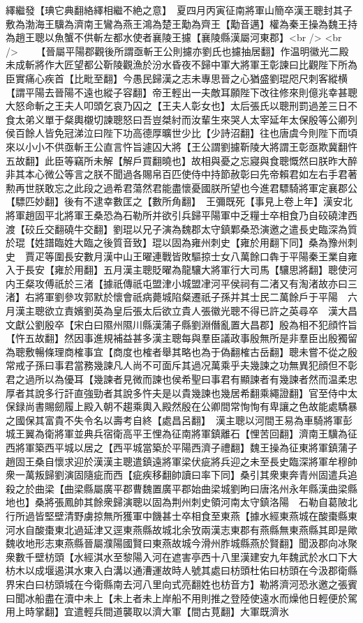 繹繼發【琠它典翻絡繹相繼不絶之意】　夏四月丙寅征南將軍山簡卒漢王聰封其子敷為渤海王驥為濟南王鸞為燕王鴻為楚王勱為齊王【勱音邁】權為秦王操為魏王持為趙王聰以魚蟹不供斬左都水使者襄陵王攄【襄陵縣漢屬河東郡】<br />
<br />
　　【晉屬平陽郡觀後所謂亟斬王公則攄亦劉氏也攄抽居翻】作温明徽光二殿未成斬將作大匠望都公靳陵觀漁於汾水昏夜不歸中軍大將軍王彰諫曰比觀陛下所為臣實痛心疾首【比毗至翻】今愚民歸漢之志未專思晉之心猶盛劉琨咫尺刺客縱横【謂平陽去晉陽不遠也縱子容翻】帝王輕出一夫敵耳願陛下改往修來則億兆幸甚聰大怒命斬之王夫人叩頭乞哀乃囚之【王夫人彰女也】太后張氏以聰刑罰過差三日不食太弟义單于粲輿櫬切諫聰怒曰吾豈桀紂而汝輩生來哭人太宰延年太保殷等公卿列侯百餘人皆免冠涕泣曰陛下功高德厚曠世少比【少詩沼翻】往也唐虞今則陛下而頃來以小小不供亟斬王公直言忤旨遽囚大將【王公謂劉攄靳陵大將謂王彰亟欺冀翻忤五故翻】此臣等竊所未解【解戶買翻曉也】故相與憂之忘寢與食聰慨然曰朕昨大醉非其本心微公等言之朕不聞過各賜帛百匹使侍中持節赦彰曰先帝賴君如左右手君著勲再世朕敢忘之此段之過希君蕩然君能盡懷憂國朕所望也今進君驃騎將軍定襄郡公【驃匹妙翻】後有不逮幸數匡之【數所角翻】　王彌既死【事見上卷上年】漢安北將軍趙固平北將軍王桑恐為石勒所并欲引兵歸平陽軍中乏糧士卒相食乃自䂭磽津西渡【䂭丘交翻磽牛交翻】劉琨以兄子演為魏郡太守鎮鄴桑恐演邀之遣長史臨深為質於琨【姓譜臨姓大臨之後質音致】琨以固為雍州刺史【雍於用翻下同】桑為豫州刺史　賈疋等圍長安數月漢中山王曜連戰皆敗驅掠士女八萬餘口犇于平陽秦王業自雍入于長安【雍於用翻】五月漢主聰貶曜為龍驤大將軍行大司馬【驤思將翻】聰使河内王粲攻傅祇於三渚【據祇傳祇屯盟津小城盟冿河平侯祠有二渚又有淘渚故亦曰三渚】右將軍劉參攻郭默於懷會祇病薨城陷粲遷祇子孫并其士民二萬餘戶于平陽　六月漢主聰欲立責嬪劉英為皇后張太后欲立貴人張徽光聰不得已許之英尋卒　漢大昌文獻公劉殷卒【宋白曰隰州隰川縣漢蒲子縣劉淵僭亂置大昌郡】殷為相不犯顔忤旨【忤五故翻】然因事進規補益甚多漢主聰每與羣臣議政事殷無所是非羣臣出殷獨留為聰敷暢條理商榷事宜【商度也榷者舉其略也為于偽翻榷古岳翻】聰未嘗不從之殷常戒子孫曰事君當務幾諫凡人尚不可面斥其過况萬乘乎夫幾諫之功無異犯顔但不彰君之過所以為優耳【幾諫者見微而諫也侯希聖曰事君有顯諫者有幾諫者然而温柔忠厚者其說多行訐直強勁者其說多忤夫是以貴幾諫也幾居希翻乘繩證翻】官至侍中太保録尚書賜劒履上殿入朝不趨乘輿入殿然殷在公卿間常恂恂有卑讓之色故能處驕暴之國保其富貴不失令名以壽考自終【處昌呂翻】　漢主聰以河間王易為車騎將軍彭城王翼為衛將軍並典兵宿衛高平王悝為征南將軍鎮離石【悝苦回翻】濟南王驥為征西將軍築西平城以居之【西平城當築於平陽西濟子禮翻】魏王操為征東將軍鎮蒲子　趙固王桑自懷求迎於漢漢主聰遣鎮遠將軍梁伏疵將兵迎之未至長史臨深將軍牟穆帥衆一萬叛歸劉演固隨疵而西【疵疾移翻帥讀曰率下同】桑引其衆東奔青州固遣兵追殺之於曲梁【曲梁縣屬廣平郡曹魏置廣平郡始曲梁城劉昫曰唐洺州永年縣漢曲梁縣地也】桑將張鳳帥其餘衆歸演聰以固為荆州刺史領河南太守鎮洛陽　石勒自葛陂北行所過皆堅壁清野虜掠無所獲軍中饑甚士卒相食至東燕【據水經東燕城在酸棗縣東河水自酸棗東北過延津又逕東燕縣故城北余攷兩漢志東郡有燕縣無東燕縣其即是歟魏收地形志東燕縣晉屬濮陽國賢曰東燕故城今滑州胙城縣燕於賢翻】聞汲郡向冰聚衆數千壁枋頭【水經淇水至黎陽入河在遮害亭西十八里漢建安九年魏武於水口下大枋木以成堰遏淇水東入白溝以通漕運故時人號其處曰枋頭杜佑曰枋頭在今汲郡衛縣界宋白曰枋頭城在今衛縣南去河八里向式亮翻姓也枋音方】勒將濟河恐氷邀之張賓曰聞冰船盡在瀆中未上【未上者未上岸船不用則推之登陸使遠水而燥他日輕便於駕用上時掌翻】宜遣輕兵間道襲取以濟大軍【間古莧翻】大軍既濟氷